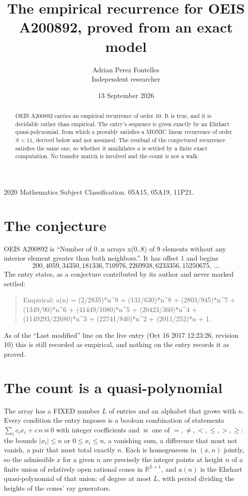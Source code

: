 \documentclass[11pt,a4paper]{article}
\title{The empirical recurrence for OEIS A200892, proved from an exact model}
\author{Adrian Perez Fontelles\\ \small Independent researcher}
\date{13 September 2026}
\theoremstyle{plain}
\theoremstyle{definition}
\begin{document}
\maketitle

\begin{abstract}
OEIS A200892 carries an empirical recurrence of order $10$. It is true, and it is
decidable rather than empirical. The entry's sequence is given exactly by an Ehrhart quasi-polynomial, from
which $a$ provably satisfies a MONIC linear recurrence of order $S=11$, derived below and not
assumed. The residual of the conjectured recurrence satisfies the same one, so whether it
annihilates $a$ is settled by a finite exact computation. No transfer matrix is involved and
the count is not a walk.
\end{abstract}

\noindent\small 2020 Mathematics Subject Classification. 05A15, 05A19, 11P21.\normalsize

\section{The conjecture}

OEIS A200892 is ``Number of 0..n arrays x(0..8) of 9 elements without any interior element greater than both neighbors.''. It has offset $1$ and begins
\[
200, 4059, 34350, 181336, 710976, 2269938, 6233356, 15250675,\ \dots
\]
The entry states, as a conjecture contributed by its author and never marked settled:
\begin{quote}
Empirical: a(n) = (2/2835)*n\^{}9 + (131/630)*n\^{}8 + (2803/945)*n\^{}7 + (1349/90)*n\^{}6 + (41449/1080)*n\^{}5 + (20423/360)*n\^{}4 + (1149293/22680)*n\^{}3 + (22741/840)*n\^{}2 + (2011/252)*n + 1.
\end{quote}
As of the ``Last modified'' line on the live entry (Oct 16 2017 12:23:26, revision 10)
this is still recorded as empirical, and nothing on the entry records it as proved.

\section{The count is a quasi-polynomial}

The array has a FIXED number $L$ of entries and an alphabet that grows with $n$. Every
condition the entry imposes is a boolean combination of statements
$\sum_i c_ix_i + c\,n \bowtie 0$ with integer coefficients and $\bowtie$ one of
$=,\ne,<,\le,>,\ge$: the bounds $|x_i|\le n$ or $0\le x_i\le n$, a vanishing sum, a difference
that must not vanish, a pair that must total exactly $n$. Each is homogeneous in $(x,n)$
jointly, so the admissible $x$ for a given $n$ are precisely the integer points at height $n$
of a finite union of relatively open rational cones in $\mathbb{R}^{L+1}$, and $a(n)$ is
the Ehrhart quasi-polynomial of that union: of degree at most $L$, with period dividing the
heights of the cones' ray generators.
\end{document}
